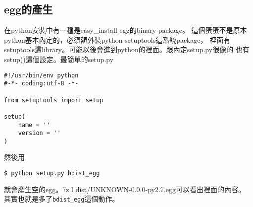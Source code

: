 \subsection{egg的產生}
在python安裝中有一種是easy\_install egg的binary package。
這個蛋蛋不是原本python基本內定的，必須額外裝python-setuptools這系統package，
裡面有setuptools這library。可能以後會進到python的裡面。跟內定setup.py很像的
也有setup()這個設定。最簡單的setup.py
\begin{verbatim}
#!/usr/bin/env python
#-*- coding:utf-8 -*-

from setuptools import setup

setup(
    name = ''
    version = ''
)
\end{verbatim}
然後用
\begin{verbatim}
$ python setup.py bdist_egg
\end{verbatim}
就會產生空的egg。7z l dist/UNKNOWN-0.0.0-py2.7.egg可以看出裡面的內容。
其實也就是多了\verb=bdist_egg=這個動作。
